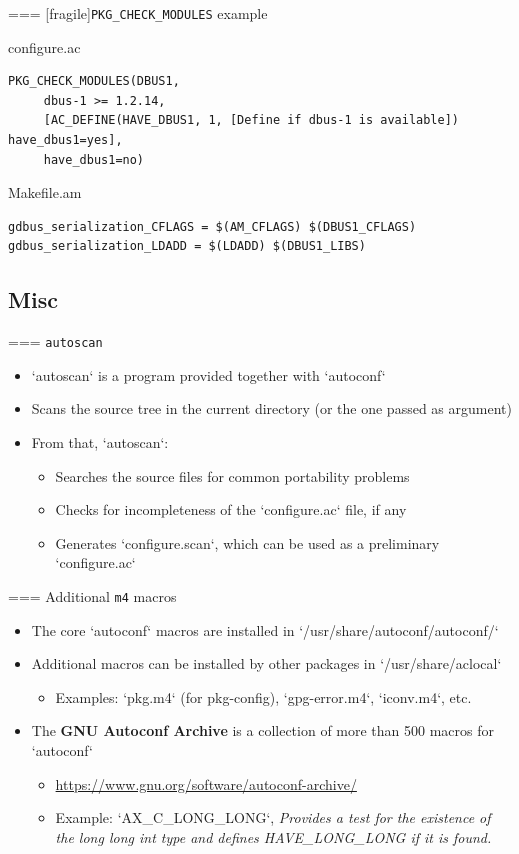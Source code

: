=== [fragile]{{\tt PKG\_CHECK\_MODULES} example}

\begin{block}{configure.ac}
\begin{verbatim}
PKG_CHECK_MODULES(DBUS1,
     dbus-1 >= 1.2.14,
     [AC_DEFINE(HAVE_DBUS1, 1, [Define if dbus-1 is available]) have_dbus1=yes],
     have_dbus1=no)
\end{verbatim}
\end{block}

\begin{block}{Makefile.am}
\begin{verbatim}
gdbus_serialization_CFLAGS = $(AM_CFLAGS) $(DBUS1_CFLAGS)
gdbus_serialization_LDADD = $(LDADD) $(DBUS1_LIBS)
\end{verbatim}
\end{block}



\subsection{Misc}

=== {{\tt autoscan}}
  \begin{itemize}
  \item `autoscan` is a program provided together with `autoconf`
  \item Scans the source tree in the current directory (or the one
    passed as argument)
  \item From that, `autoscan`:
    \begin{itemize}
    \item Searches the source files for common portability problems
    \item Checks for incompleteness of the `configure.ac` file, if any
    \item Generates `configure.scan`, which can be used as a
      preliminary `configure.ac`
    \end{itemize}
  \end{itemize}


=== {Additional {\tt m4} macros}
  \begin{itemize}
  \item The core `autoconf` macros are installed in
    `/usr/share/autoconf/autoconf/`
  \item Additional macros can be installed by other packages in
    `/usr/share/aclocal`
    \begin{itemize}
    \item Examples: `pkg.m4` (for pkg-config),
      `gpg-error.m4`, `iconv.m4`, etc.
    \end{itemize}
  \item The {\bf GNU Autoconf Archive} is a collection of more than
    500 macros for `autoconf`
    \begin{itemize}
    \item \url{https://www.gnu.org/software/autoconf-archive/}
    \item Example:
      `AX_C_LONG_LONG`, {\em Provides a test for the existence of the long long int type and defines HAVE\_LONG\_LONG if it is found.}
    \end{itemize}
  \end{itemize}


